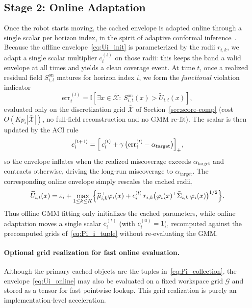 \documentclass[lettersize,journal]{IEEEtran}
\begin{document}
\subsection{Stage 2: Online Adaptation}\label{subsec:online_update}
Once the robot starts moving, the cached envelope is adapted online through a single scalar per horizon index, in the spirit of adaptive conformal inference~\cite{gibbs2021adaptiveconformalinferencedistribution}. Because the offline envelope~\eqref{eq:Ui_init} is parameterized by the radii $r_{i,k}$, we adapt a single scalar multiplier $c_i^{(t)}$ on those radii: this keeps the band a valid envelope at all times and yields a clean coverage event.
At time $t$, once a realized residual field $S^{\mathrm{on}}_{i,t}$ matures for horizon index $i$, we form the \emph{functional} violation indicator
\begin{equation}
\mathrm{err}^{(t)}_i = \mathbb{I}\!\left[\exists x\in\bar{\mathcal X}:\ S^{\mathrm{on}}_{i,t}(x) > \widetilde U_{i,t}(x)\right],
\label{eq:online_coeff}
\end{equation}
evaluated only on the discretization grid $\bar{\mathcal X}$ of Section~\ref{sec:score-comp} (cost $O(K p_i |\bar{\mathcal X}|)$, no full-field reconstruction and no GMM re-fit). The scalar is then updated by the ACI rule
\begin{equation}
c_{i}^{(t+1)} = \Bigl[\,c_{i}^{(t)} + \gamma\,\bigl( \mathrm{err}^{(t)}_i - \alpha_{\text{target}} \bigr)\Bigr]_{+},
\label{eq:acp_update}
\end{equation}
so the envelope inflates when the realized miscoverage exceeds $\alpha_{\text{target}}$ and contracts otherwise, driving the long-run miscoverage to $\alpha_{\text{target}}$.
The corresponding online envelope simply rescales the cached radii,
\begin{equation}
\widetilde U_{i,t}(x)
=
\varepsilon_i+\max_{1\le k\le K}\Bigl\{\widehat\mu_{i,k}^\top\varphi_i(x)+c_i^{(t)}\,r_{i,k}\bigl(\varphi_i(x)^\top\widehat\Sigma_{i,k}\,\varphi_i(x)\bigr)^{1/2}\Bigr\}.
\label{eq:Ui_online}
\end{equation}
Thus offline GMM fitting only initializes the cached parameters, while online adaptation moves a single scalar $c_i^{(t)}$ (with $c_i^{(0)}=1$), recomputed against the precomputed grids of~\eqref{eq:Pi_i_tuple} without re-evaluating the GMM.

\paragraph{Optional grid realization for fast online evaluation.}
Although the primary cached objects are the tuples in~\eqref{eq:Pi_collection}, the envelope~\eqref{eq:Ui_online} may also be evaluated on a fixed workspace grid $\mathcal G$ and stored as a tensor for fast pointwise lookup.
This grid realization is purely an implementation-level acceleration.
\end{document}
